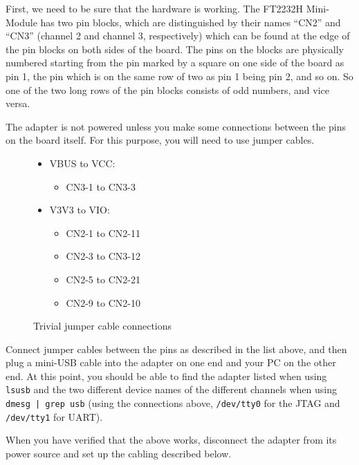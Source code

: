 \documentclass[a4paper,11pt,reqno]{amsart}
\begin{document}
{First, we need to be sure that the hardware is working. The FT2232H Mini-Module has two pin blocks, which are distinguished by their names ``CN2'' and ``CN3'' (channel 2 and channel 3, respectively) which can be found at the edge of the pin blocks on both sides of the board. The pins on the blocks are physically numbered starting from the pin marked by a square on one side of the board as pin 1, the pin which is on the same row of two as pin 1 being pin 2, and so on. So one of the two long rows of the pin blocks consists of odd numbers, and vice versa.

The adapter is not powered unless you make some connections between the pins on the board itself. For this purpose, you will need to use jumper cables.

\begin{figure}[hb]
\begin{center}
\begin{itemize}
\item VBUS to VCC:
		\begin{itemize}
		\item CN3-1 to CN3-3
		\end{itemize}
\item V3V3 to VIO:
		\begin{itemize}
		\item CN2-1 to CN2-11
		\item CN2-3 to CN3-12
		\item CN2-5 to CN2-21
		\item CN2-9 to CN2-10
		\end{itemize}
\end{itemize}
\end{center}
\caption{Trivial jumper cable connections}
\label{fig:con1}
\end{figure}

Connect jumper cables between the pins as described in the list above, and then plug a mini-USB cable into the adapter on one end and your PC on the other end. At this point, you should be able to find the adapter listed when using \texttt{lsusb} and the two different device names of the different channels when using \texttt{dmesg | grep usb} (using the connections above, \texttt{/dev/tty0} for the JTAG and \texttt{/dev/tty1} for UART).

When you have verified that the above works, disconnect the adapter from its power source and set up the cabling described below.

}
\end{document}

